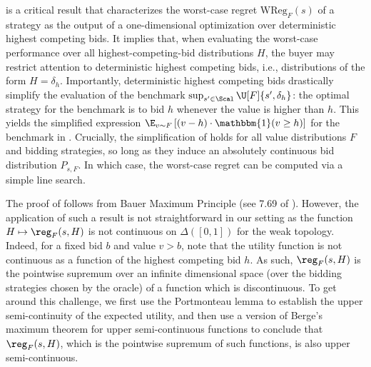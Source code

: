  is a critical result that characterizes the worst-case regret $\mathrm{WReg}_F(s)$ of a strategy as the output of a one-dimensional optimization over deterministic highest competing bids.
It implies that, when evaluating the worst-case performance over all highest-competing-bid distributions $H$, the buyer may restrict attention to deterministic highest competing bids, i.e., distributions of the form  $H = \delta_h$. Importantly, deterministic highest competing bids drastically simplify the evaluation of the benchmark $\sup_{s' \in \Scal} \U[F]{s',\delta_h}$: the optimal strategy for the benchmark is to bid $h$ whenever the value is higher than $h$. This yields the simplified expression $\E_{v \sim F}\left[ (v-h) \cdot \mathbbm{1}(v \geq h) \right]$ for the benchmark in . Crucially, the simplification of  holds for all value distributions $F$ and bidding strategies, so long as they induce an absolutely continuous bid distribution $P_{s,F}$. In which case, the worst-case regret can be computed via a simple line search.


The proof of  follows from Bauer Maximum Principle (see 7.69 of \citealt{aliprantis2006infinite}). However, the application of such a result is not straightforward in our setting as the function $H \mapsto \reg_F(s,H)$ is not continuous on $\Delta([0,1])$ for the weak topology. Indeed, for a fixed bid $b$ and value $v > b$, note that the utility function is not continuous as a function of the highest competing bid $h$. As such, $\reg_F(s,H)$ is the pointwise supremum over an infinite dimensional space (over the bidding strategies chosen by the oracle) of a function which is discontinuous. To get around this challenge, we first use the Portmonteau lemma to establish the upper semi-continuity of the expected utility, and then use a version of Berge's maximum theorem for upper semi-continuous functions to conclude that $\reg_F(s,H)$, which is the pointwise supremum of such functions, is also upper semi-continuous.


